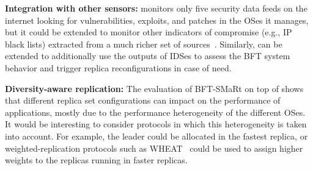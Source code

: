 \textbf{Integration with other sensors:}
\system monitors only five security data feeds on the internet looking for vulnerabilities, exploits, and patches in the OSes it manages, but it could be extended to monitor other indicators of compromise (e.g., IP black lists) extracted from a much richer set of sources~\cite{Liao:2016,Sabottke:2015}.
Similarly, \system can be extended to additionally use the outputs of IDSes to assess the BFT system behavior and trigger replica reconfigurations in case of need.

\textbf{Diversity-aware replication:}
The evaluation of BFT-SMaRt on top of \system shows that different replica set configurations can impact on the performance of applications, mostly due to the performance heterogeneity of the different OSes.
It would be interesting to consider protocols in which this heterogeneity is taken into account.
For example, the leader could be allocated in the fastest replica, or weighted-replication protocols such as WHEAT~\cite{Sousa:2015} could be used to assign higher weights to the replicas running in faster replicas.

